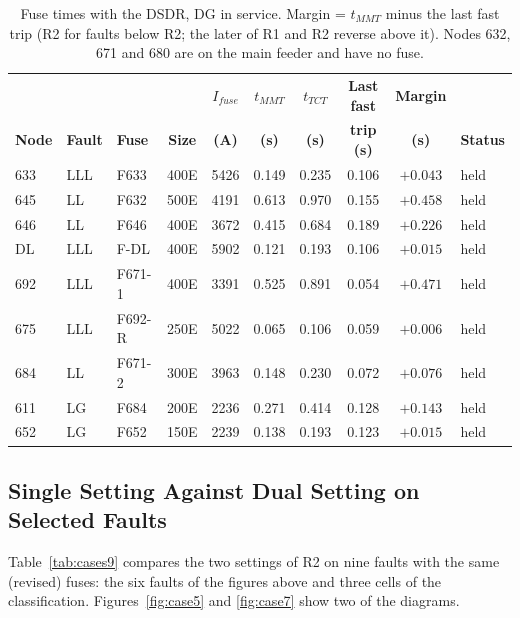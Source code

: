 \documentclass[12pt,a4paper]{article}
\begin{document}
\begin{table}[H]
\centering\footnotesize
\setlength{\tabcolsep}{4pt}
\begin{tabular}{|l|l|l|c|c|c|c|c|c|l|}
\hline
 & & & & \textbf{$I_{fuse}$} & \textbf{$t_{MMT}$} & \textbf{$t_{TCT}$} & \textbf{Last fast} & \textbf{Margin} & \\
\textbf{Node} & \textbf{Fault} & \textbf{Fuse} & \textbf{Size} & \textbf{(A)} & \textbf{(s)} & \textbf{(s)} & \textbf{trip (s)} & \textbf{(s)} & \textbf{Status} \\ \hline
633 & LLL & F633 & 400E & 5426 & 0.149 & 0.235 & 0.106 & $+0.043$ & held \\ \hline
645 & LL & F632 & 500E & 4191 & 0.613 & 0.970 & 0.155 & $+0.458$ & held \\ \hline
646 & LL & F646 & 400E & 3672 & 0.415 & 0.684 & 0.189 & $+0.226$ & held \\ \hline
DL & LLL & F-DL & 400E & 5902 & 0.121 & 0.193 & 0.106 & $+0.015$ & held \\ \hline
692 & LLL & F671-1 & 400E & 3391 & 0.525 & 0.891 & 0.054 & $+0.471$ & held \\ \hline
675 & LLL & F692-R & 250E & 5022 & 0.065 & 0.106 & 0.059 & $+0.006$ & held \\ \hline
684 & LL & F671-2 & 300E & 3963 & 0.148 & 0.230 & 0.072 & $+0.076$ & held \\ \hline
611 & LG & F684 & 200E & 2236 & 0.271 & 0.414 & 0.128 & $+0.143$ & held \\ \hline
652 & LG & F652 & 150E & 2239 & 0.138 & 0.193 & 0.123 & $+0.015$ & held \\ \hline
\end{tabular}
\caption{Fuse times with the DSDR, DG in service. Margin = $t_{MMT}$ minus the last fast trip (R2 for faults below R2; the later
of R1 and R2 reverse above it). Nodes 632, 671 and 680 are on the main feeder and have no fuse.}
\label{tab:t4b}
\end{table}

\subsection{Single Setting Against Dual Setting on Selected Faults}
Table~\ref{tab:cases9} compares the two settings of R2 on nine faults with the same (revised) fuses: the six
faults of the figures above and three cells of the classification.
Figures~\ref{fig:case5} and \ref{fig:case7} show two of the diagrams.
\end{document}
